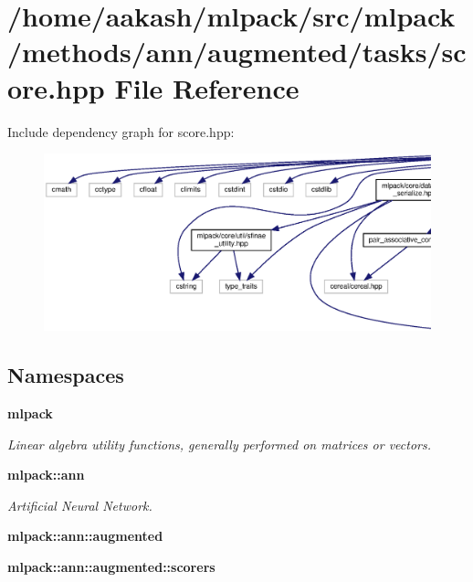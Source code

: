 \section{/home/aakash/mlpack/src/mlpack/methods/ann/augmented/tasks/score.hpp File Reference}
\label{score_8hpp}
Include dependency graph for score.\+hpp\+:
\nopagebreak
\begin{figure}[H]
\begin{center}
\leavevmode
\includegraphics[width=350pt]{score_8hpp__incl}
\end{center}
\end{figure}
\subsection*{Namespaces}
\begin{DoxyCompactItemize}
\item 
 \textbf{ mlpack}
\begin{DoxyCompactList}\small\item\em Linear algebra utility functions, generally performed on matrices or vectors. \end{DoxyCompactList}\item 
 \textbf{ mlpack\+::ann}
\begin{DoxyCompactList}\small\item\em Artificial Neural Network. \end{DoxyCompactList}\item 
 \textbf{ mlpack\+::ann\+::augmented}
\item 
 \textbf{ mlpack\+::ann\+::augmented\+::scorers}
\end{DoxyCompactItemize}
